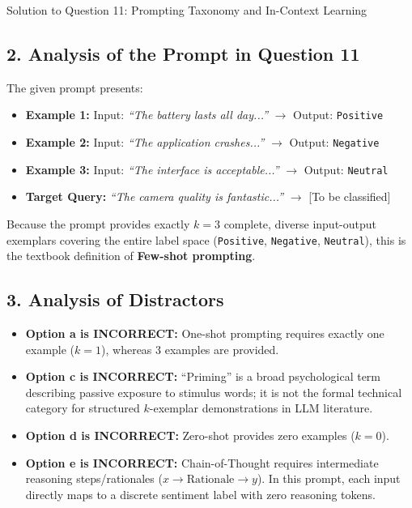 \documentclass[11pt,a4paper]{article}
\begin{document}
\begin{solutionbox}{Solution to Question 11: Prompting Taxonomy and In-Context Learning}
\subsection*{2. Analysis of the Prompt in Question 11}
The given prompt presents:
\begin{itemize}[leftmargin=1.5em,itemsep=1pt]
    \item \textbf{Example 1:} Input: \textit{``The battery lasts all day...''} $\to$ Output: \texttt{Positive}
    \item \textbf{Example 2:} Input: \textit{``The application crashes...''} $\to$ Output: \texttt{Negative}
    \item \textbf{Example 3:} Input: \textit{``The interface is acceptable...''} $\to$ Output: \texttt{Neutral}
    \item \textbf{Target Query:} \textit{``The camera quality is fantastic...''} $\to$ [To be classified]
\end{itemize}
Because the prompt provides exactly $k = 3$ complete, diverse input-output exemplars covering the entire label space (\texttt{Positive}, \texttt{Negative}, \texttt{Neutral}), this is the textbook definition of \textbf{Few-shot prompting}.

\subsection*{3. Analysis of Distractors}
\begin{itemize}[leftmargin=1.5em,itemsep=2pt]
    \item \textbf{Option a is INCORRECT:} One-shot prompting requires exactly one example ($k = 1$), whereas 3 examples are provided.
    \item \textbf{Option c is INCORRECT:} ``Priming'' is a broad psychological term describing passive exposure to stimulus words; it is not the formal technical category for structured $k$-exemplar demonstrations in LLM literature.
    \item \textbf{Option d is INCORRECT:} Zero-shot provides zero examples ($k = 0$).
    \item \textbf{Option e is INCORRECT:} Chain-of-Thought requires intermediate reasoning steps/rationales ($x \to \text{Rationale} \to y$). In this prompt, each input directly maps to a discrete sentiment label with zero reasoning tokens.
\end{itemize}
\end{solutionbox}
\end{document}
